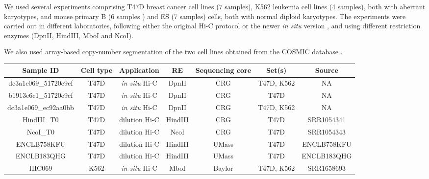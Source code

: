 \documentclass{bioinfo}
\begin{document}
\begin{methods}
We used several experiments comprising T47D breast cancer cell
lines (7 samples), K562 leukemia cell lines (4 samples), both with
aberrant karyotypes, and mouse primary B (6 samples ) and ES (7 samples)
cells, both with normal diploid karyotypes. The experiments were carried
out in different laboratories, following either the original Hi-C protocol
\citep{lieberman2009comprehensive} or the newer \textit{in situ} version
\citep{rao20143d}, and using different restriction enzymes (DpnII,
HindIII, MboI and NcoI).

We also used array-based copy-number segmentation of the two cell
lines obtained from the COSMIC database \citep{forbes2010cosmic}.

\begin{table}
{\begin{tabular}{ccccccc}
  \toprule
  \textbf{Sample ID} & \textbf{Cell type} & \textbf{Application} &
  \textbf{RE} & \textbf{Sequencing core} & \textbf{Set(s)} &
  \textbf{Source} \\
  \midrule
dc3a1e069\_51720e9cf & T47D & \textit{in situ} Hi-C &
  DpnII & CRG & T47D, K562 & NA \\
b1913e6c1\_51720e9cf & T47D & \textit{in situ} Hi-C &
  DpnII & CRG & T47D & NA \\
dc3a1e069\_ec92aa0bb & T47D & \textit{in situ} Hi-C &
  DpnII & CRG & T47D, K562 & NA \\
HindIII\_T0 & T47D & dilution Hi-C &
  HindIII & CRG & T47D & SRR1054341 \\
NcoI\_T0    & T47D & dilution Hi-C &
  NcoI      & CRG & T47D & SRR1054343 \\
ENCLB758KFU & T47D & dilution Hi-C &
  HindIII   & UMass & T47D & ENCLB758KFU \\
ENCLB183QHG & T47D & dilution Hi-C &
  HindIII   & UMass & T47D & ENCLB183QHG \\
HIC069  & K562 & \textit{in situ} Hi-C &
  MboI & Baylor & T47D, K562 &    SRR1658693 \\

\end{tabular}}
\end{table}
\end{methods}
\end{document}
